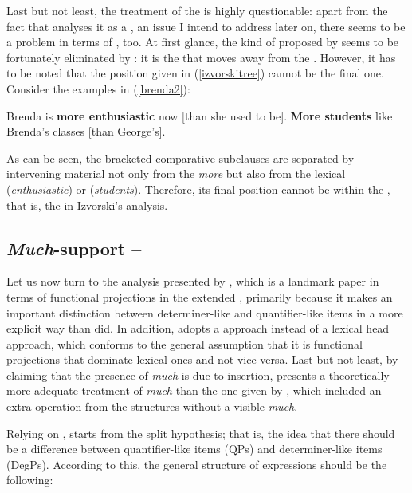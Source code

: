 Last but not least, the treatment of the  is highly questionable: apart from the fact that \citet{izvorski1995} analyses it as a , an issue I intend to address later on, there seems to be a problem in terms of , too. At first glance, the kind of  proposed by \citet{bresnan1973} seems to be fortunately eliminated by \citet{izvorski1995}: it is the  that moves away from the . However, it has to be noted that the position given in (\ref{izvorskitree}) cannot be the final one. Consider the examples in (\ref{brenda2}):

\ea \label{brenda2}
\ea Brenda is \textbf{more enthusiastic} now [than she used to be].
\ex \textbf{More students} like Brenda's classes [than George's].
\z
\z

As can be seen, the bracketed comparative subclauses are separated by intervening material not only from the  \textit{more} but also from the lexical  (\textit{enthusiastic}) or  (\textit{students}). Therefore, its final position cannot be within the , that is, the  in Izvorski's analysis.

\subsection{\textit{Much}-support -- \citet{corver1997}} \label{sec:2muchsupport}
Let us now turn to the analysis presented by \citet{corver1997}, which is a landmark paper in terms of functional projections in the extended , primarily because it makes an important distinction between determiner-like and quantifier-like  items in a more explicit way than \citet{bresnan1973} did. In addition, \citet{corver1997} adopts a  approach instead of a lexical head approach, which conforms to the general assumption that it is functional projections that dominate lexical ones and not vice versa. Last but not least, by claiming that the presence of \textit{much} is due to insertion, \citet{corver1997} presents a theoretically more adequate treatment of \textit{much} than the one given by \citet{bresnan1973}, which included an extra  operation from the structures without a visible \textit{much}.

Relying on \citet{bresnan1973}, \citet[120--123]{corver1997} starts from the split  hypothesis; that is, the idea that there should be a difference between quantifier-like  items (QPs) and determiner-like  items (DegPs). According to this, the general structure of  expressions should be the following:

